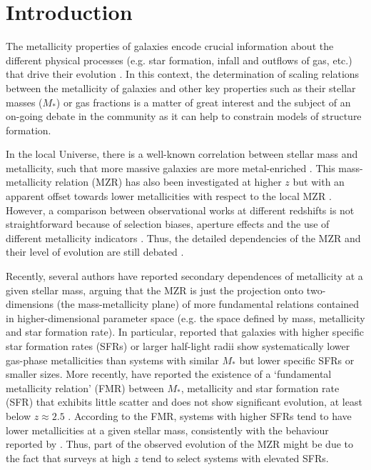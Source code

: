 \documentclass[useAMS,usenatbib]{mn2e}
\begin{document}
\section{Introduction}
\label{sec:introduction}

The metallicity properties of galaxies encode crucial information about the different physical
processes (e.g. star formation, infall and outflows of gas, etc.) 
that drive their evolution \citep[e.g.][]{tinsley1980, dave2010, finlator2016}. 
In this context, the determination of scaling relations between the metallicity of
galaxies and other key properties such as their stellar masses ($M_*$) or gas fractions is a matter of great
interest and the subject of an on-going debate in the community as it can help to constrain models 
of structure formation.    

In the local Universe, there is a well-known correlation between stellar mass and metallicity, 
such that more massive galaxies are more metal-enriched
\citep[e.g.][]{lequeux1979, tremonti2004}.  This mass-metallicity relation (MZR) has also been investigated at higher
$z$ but with an apparent offset towards lower metallicities with respect to the local MZR 
\citep[e.g.][]{savaglio2005, erb2006, maiolino2008}.  However, a comparison between observational
works at different redshifts is not straightforward because of 
selection biases, aperture effects and the use of different metallicity indicators \citep[e.g.][]{steidel2014}.
Thus, the detailed dependencies of the MZR and their level of evolution are still debated
\citep[e.g.][]{kewley2008,telford2016}.

Recently, several authors have reported secondary dependences of metallicity at a given stellar mass, arguing
that the MZR is just the projection onto two-dimensions (the mass-metallicity plane) 
of more fundamental relations contained in higher-dimensional parameter space 
(e.g. the space defined by mass, metallicity and star formation rate).
In particular, \citet{ellison2008} reported that galaxies with
higher specific star formation rates (SFRs) or larger half-light radii show
systematically lower gas-phase metallicities than systems with similar $M_*$ but 
lower specific SFRs or smaller sizes.  
More recently, \citet{mannucci2010} have reported the existence of a 
`fundamental metallicity relation' (FMR) between $M_*$, metallicity and star formation rate (SFR)
that exhibits little scatter and does not show significant evolution, at least below $z \approx 2.5$
\citep[see also][]{laralopez2010a}. 
According to the FMR, systems with higher SFRs tend to have lower metallicities at a given stellar 
mass, consistently with the behaviour reported by \citet{ellison2008}.
Thus, part of the observed evolution
of the MZR might be due to the fact that surveys at high $z$ tend to select systems with elevated
SFRs.  
\end{document}

